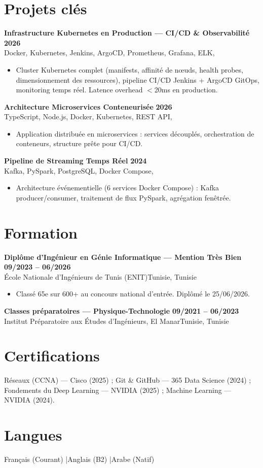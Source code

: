 \documentclass[a4paper,10pt]{article}
\newcommand{\cventry}[4]{\textbf{#1} \hfill \textbf{#4}\\[0.5pt]#2{\ifx\relax#3\relax\else, #3\fi}\par\vspace{1pt}}
\begin{document}
\section{Projets clés}
\cventry{Infrastructure Kubernetes en Production --- CI/CD \& Observabilité}{Docker, Kubernetes, Jenkins, ArgoCD, Prometheus, Grafana, ELK}{}{2026}
\begin{itemize}
  \item Cluster Kubernetes complet (manifests, affinité de nœuds, health probes, dimensionnement des ressources), pipeline CI/CD Jenkins + ArgoCD GitOps, monitoring temps réel. Latence overhead $<$20ms en production.
\end{itemize}
\cventry{Architecture Microservices Conteneurisée}{TypeScript, Node.js, Docker, Kubernetes, REST API}{}{2026}
\begin{itemize}
  \item Application distribuée en microservices : services découplés, orchestration de conteneurs, structure prête pour CI/CD.
\end{itemize}
\cventry{Pipeline de Streaming Temps Réel}{Kafka, PySpark, PostgreSQL, Docker Compose}{}{2024}
\begin{itemize}
  \item Architecture événementielle (6 services Docker Compose) : Kafka producer/consumer, traitement de flux PySpark, agrégation fenêtrée.
\end{itemize}
\section{Formation}
\cventry{Diplôme d'Ingénieur en Génie Informatique --- Mention Très Bien}{École Nationale d'Ingénieurs de Tunis (ENIT)}{Tunisie}{09/2023 -- 06/2026}
\begin{itemize}
  \item Classé 65e sur 600+ au concours national d'entrée. Diplômé le 25/06/2026.
\end{itemize}
\cventry{Classes préparatoires --- Physique-Technologie}{Institut Préparatoire aux Études d'Ingénieurs, El Manar}{Tunisie}{09/2021 -- 06/2023}
\section{Certifications}
Réseaux (CCNA) --- Cisco (2025) ; Git \& GitHub --- 365 Data Science (2024) ; Fondements du Deep Learning --- NVIDIA (2025) ; Machine Learning --- NVIDIA (2024).
\section{Langues}
Français (Courant) \quad|\quad Anglais (B2) \quad|\quad Arabe (Natif)
\end{document}
